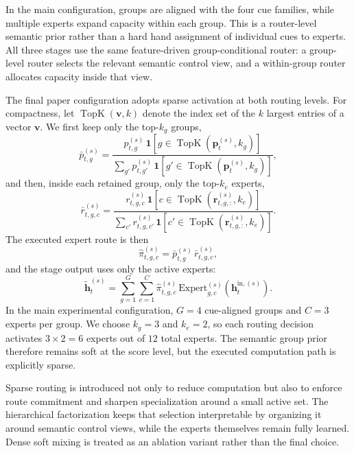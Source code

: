 \documentclass[sigconf,review,anonymous]{acmart}
\begin{document}
In the main configuration, groups are aligned with the four cue families, while multiple experts expand capacity within each group. This is a router-level semantic prior rather than a hard hand assignment of individual cues to experts. All three stages use the same feature-driven group-conditional router: a group-level router selects the relevant semantic control view, and a within-group router allocates capacity inside that view.

The final paper configuration adopts sparse activation at both routing levels. For compactness, let $\operatorname{TopK}(\mathbf{v},k)$ denote the index set of the $k$ largest entries of a vector $\mathbf{v}$. We first keep only the top-$k_g$ groups,
\begin{equation}
\bar{p}^{(s)}_{t,g}
=
\frac{p^{(s)}_{t,g}\,\mathbf{1}[g\in \operatorname{TopK}(\mathbf{p}^{(s)}_t,k_g)]}{\sum_{g'} p^{(s)}_{t,g'}\,\mathbf{1}[g'\in \operatorname{TopK}(\mathbf{p}^{(s)}_t,k_g)]},
\label{eq:sparse-route}
\end{equation}
and then, inside each retained group, only the top-$k_e$ experts,
\begin{equation}
\bar{r}^{(s)}_{t,g,c}
=
\frac{r^{(s)}_{t,g,c}\,\mathbf{1}[c\in \operatorname{TopK}(\mathbf{r}^{(s)}_{t,g,:},k_e)]}{\sum_{c'} r^{(s)}_{t,g,c'}\,\mathbf{1}[c'\in \operatorname{TopK}(\mathbf{r}^{(s)}_{t,g,:},k_e)]}.
\label{eq:sparse-within-group}
\end{equation}
The executed expert route is then
\begin{equation}
\hat{\pi}^{(s)}_{t,g,c}=\bar{p}^{(s)}_{t,g}\,\bar{r}^{(s)}_{t,g,c},
\label{eq:executed-route}
\end{equation}
and the stage output uses only the active experts:
\begin{equation}
\tilde{\mathbf{h}}^{(s)}_t
=
\sum_{g=1}^{G}\sum_{c=1}^{C}\hat{\pi}^{(s)}_{t,g,c}\,\mathrm{Expert}^{(s)}_{g,c}(\mathbf{h}^{\mathrm{in},(s)}_t).
\label{eq:sparse-stage-routing}
\end{equation}
In the main experimental configuration, $G=4$ cue-aligned groups and $C=3$ experts per group. We choose $k_g=3$ and $k_e=2$, so each routing decision activates $3\times 2=6$ experts out of $12$ total experts. The semantic group prior therefore remains soft at the score level, but the executed computation path is explicitly sparse.

Sparse routing is introduced not only to reduce computation but also to enforce route commitment and sharpen specialization around a small active set. The hierarchical factorization keeps that selection interpretable by organizing it around semantic control views, while the experts themselves remain fully learned. Dense soft mixing is treated as an ablation variant rather than the final choice.
\end{document}
